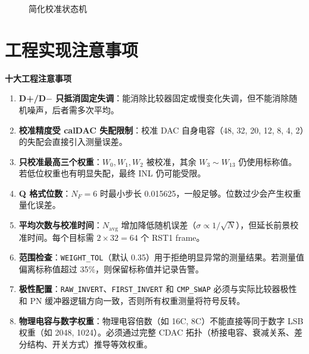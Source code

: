 \documentclass[
  UTF8,
  a4paper,
  11pt,
  oneside,
  fontset=fandol
]{ctexrep}
\newenvironment{warnbox}[1]{%
  \begin{center}
  \begin{minipage}{0.94\textwidth}
  \colorbox{lightorange}{%
    \parbox{0.96\textwidth}{\textbf{#1}}}
  \vspace{0.35em}\par
}{%
  \end{minipage}
  \end{center}
}
\newcommand{\code}[1]{\texttt{#1}}
\begin{document}
\begin{figure}[H]
\centering
{}
\caption{简化校准状态机}
\label{fig:fsm}
\end{figure}

\chapter{工程实现注意事项}

\begin{warnbox}{十大工程注意事项}
\begin{enumerate}[leftmargin=1.5em,itemsep=2pt]
    \item \textbf{D+/D$-$ 只抵消固定失调}：能消除比较器固定或慢变化失调，但不能消除随机噪声，后者需多次平均。
    \item \textbf{校准精度受 calDAC 失配限制}：校准 DAC 自身电容（48, 32, 20, 12, 8, 4, 2）的失配会直接引入测量误差。
    \item \textbf{只校准最高三个权重}：$W_0, W_1, W_2$ 被校准，其余 $W_3 \sim W_{13}$ 仍使用标称值。若低位权重也有明显失配，最终 INL 仍可能受限。
    \item \textbf{Q 格式位数}：$N_F = 6$ 时最小步长 \SI{0.015625}{\LSB}，一般足够。位数过少会产生权重量化误差。
    \item \textbf{平均次数与校准时间}：$N_{\mathrm{avg}}$ 增加降低随机误差（$\sigma \propto 1/\sqrt{N}$），但延长前景校准时间。每个目标需 $2 \times 32 = 64$ 个 RST1 frame。
    \item \textbf{范围检查}：\code{WEIGHT\_TOL}（默认 0.35）用于拒绝明显异常的测量结果。若测量值偏离标称值超过 35\%，则保留标称值并记录告警。
    \item \textbf{极性配置}：\code{RAW\_INVERT}、\code{FIRST\_INVERT} 和 \code{CMP\_SWAP} 必须与实际比较器极性和 PN 缓冲器逻辑方向一致，否则所有权重测量将符号反转。
    \item \textbf{物理电容与数字权重}：物理电容倍数（如 16C, 8C）不能直接等同于数字 LSB 权重（如 2048, 1024）。必须通过完整 CDAC 拓扑（桥接电容、衰减关系、差分结构、开关方式）推导等效权重。
\end{enumerate}
\end{warnbox}
\end{document}
